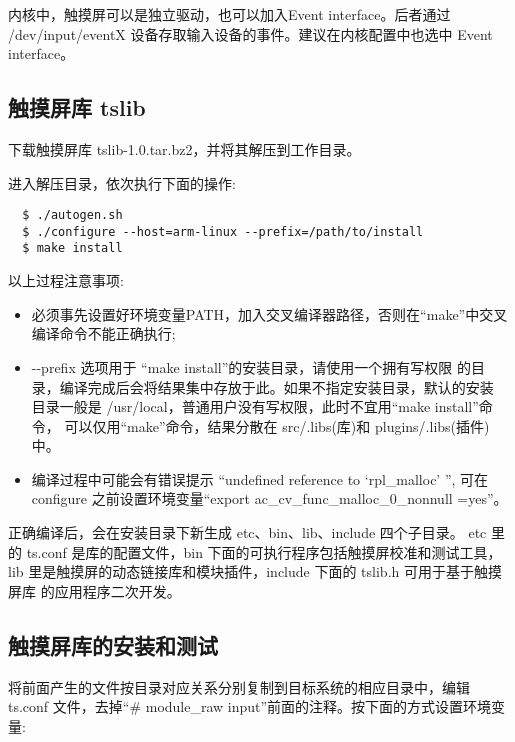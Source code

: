 内核中，触摸屏可以是独立驱动，也可以加入Event interface。后者通过
/dev/input/eventX 设备存取输入设备的事件。建议在内核配置中也选中
Event interface。

\subsection{触摸屏库 tslib}
下载触摸屏库 tslib-1.0.tar.bz2，并将其解压到工作目录。

进入解压目录，依次执行下面的操作:
\begin{verbatim}
  $ ./autogen.sh
  $ ./configure --host=arm-linux --prefix=/path/to/install
  $ make install
\end{verbatim}

以上过程注意事项:
\begin{itemize}
  \item 必须事先设置好环境变量PATH，加入交叉编译器路径，否则在``make''中交叉
	编译命令不能正确执行;
  \item -{}-prefix 选项用于 ``make install''的安装目录，请使用一个拥有写权限
	的目录，编译完成后会将结果集中存放于此。如果不指定安装目录，默认的安装
	目录一般是 /usr/local，普通用户没有写权限，此时不宜用``make install''命令，
	可以仅用``make''命令，结果分散在 src/.libs(库)和 plugins/.libs(插件)中。
  \item 编译过程中可能会有错误提示 ``undefined reference to `rpl\_malloc' '',
	可在 configure 之前设置环境变量``export ac\_cv\_func\_malloc\_0\_nonnull
	=yes''。
\end{itemize}

正确编译后，会在安装目录下新生成 etc、bin、lib、include 四个子目录。
etc 里的 ts.conf 是库的配置文件，bin 下面的可执行程序包括触摸屏校准和测试工具，
lib 里是触摸屏的动态链接库和模块插件，include 下面的 tslib.h 可用于基于触摸屏库
的应用程序二次开发。

\subsection{触摸屏库的安装和测试}
将前面产生的文件按目录对应关系分别复制到目标系统的相应目录中，编辑 ts.conf
文件，去掉``\# module\_raw input''前面的注释。按下面的方式设置环境变量:

